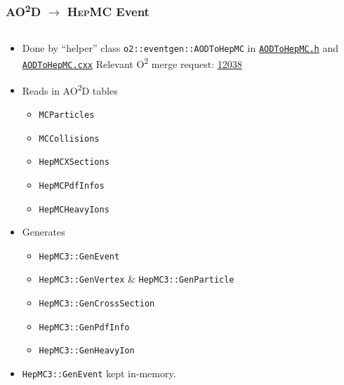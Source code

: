 \documentclass[compress,table,8pt]{beamer}
\newcommand\HepMC{{\scshape HepMC}}
\newcommand\Otwo{O\textsuperscript{2}}
\newcommand\AOD{AO\textsuperscript{2}D}
\begin{document}
\begin{frame}
  \frametitle{\AOD{} $\rightarrow$ \HepMC{} Event}

  \begin{columns}[onlytextwidth,t]
    \begin{column}{.4\linewidth}
      \begin{itemize}
      \item<+-> Done by ``helper'' class
        \texttt{o2::eventgen::AODToHepMC} in
        \href{https://github.com/cholmcc/AliceO2/blob/cholmcc_aod_to_hepmc/Generators/include/Generators/AODToHepMC.h}{\texttt{AODToHepMC.h}}
        and
        \href{https://github.com/cholmcc/AliceO2/blob/cholmcc_aod_to_hepmc/Generators/src/AODToHepMC.cxx}{\texttt{AODToHepMC.cxx}}
        \newline%
        {\footnotesize Relevant \Otwo{} merge request:
          \href{https://github.com/AliceO2Group/AliceO2/pull/12038}{12038}}
      \item<+-> Reads in \AOD{} tables
        \begin{itemize}
        \item \texttt{MCParticles}
        \item \texttt{MCCollisions}
        \item \texttt{HepMCXSections}
        \item \texttt{HepMCPdfInfos}
        \item \texttt{HepMCHeavyIons}
        \end{itemize}
      \item<+-> Generates
        \begin{itemize}
        \item \texttt{HepMC3::GenEvent}
        \item \texttt{HepMC3::GenVertex} \& \texttt{HepMC3::GenParticle}
        \item \texttt{HepMC3::GenCrossSection}
        \item \texttt{HepMC3::GenPdfInfo}
        \item \texttt{HepMC3::GenHeavyIon}
        \end{itemize}
      \item<+-> \texttt{HepMC3::GenEvent} kept in-memory.
      \end{itemize}
    \end{column}
    \begin{column}{.55\linewidth}
      \begin{center}

\end{center}
\end{column}
\end{columns}
\end{frame}
\end{document}
